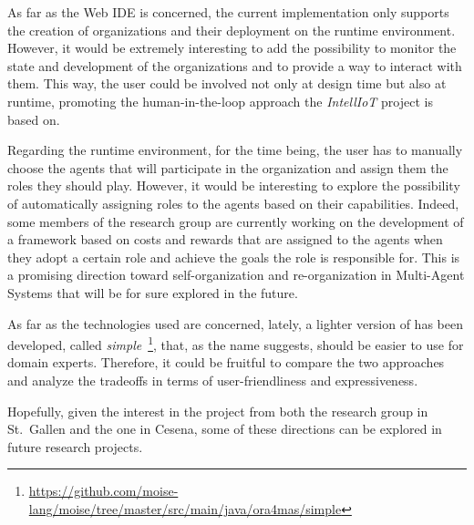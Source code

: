 As far as the Web IDE is concerned, the current implementation only supports the creation of organizations and their deployment on the runtime environment.
However, it would be extremely interesting to add the possibility to monitor the state and development of the organizations and to provide a way to interact with them.
This way, the user could be involved not only at design time but also at runtime, promoting the human-in-the-loop approach the \textit{IntellIoT} project is based on.

Regarding the runtime environment, for the time being, the user has to manually choose the agents that will participate in the organization and assign them the roles they should play.
However, it would be interesting to explore the possibility of automatically assigning roles to the agents based on their capabilities.
Indeed, some members of the research group are currently working on the development of a framework based on costs and rewards that are assigned to the agents when they adopt a certain role and achieve the goals the role is responsible for.
This is a promising direction toward self-organization and re-organization in Multi-Agent Systems that will be for sure explored in the future.

As far as the technologies used are concerned, lately, a lighter version of \moise{} has been developed, called \moise{} \textit{simple}~\footnote{\url{https://github.com/moise-lang/moise/tree/master/src/main/java/ora4mas/simple}}, that, as the name suggests, should be easier to use for domain experts.
Therefore, it could be fruitful to compare the two approaches and analyze the tradeoffs in terms of user-friendliness and expressiveness.

Hopefully, given the interest in the project from both the research group in St.\ Gallen and the one in Cesena, some of these directions can be explored in future research projects.